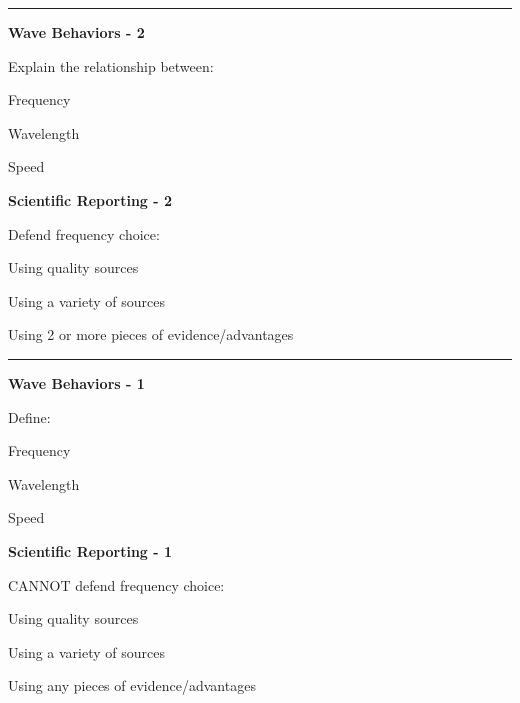 \documentclass[14pt, fleqn, paper=letter, oneside]{scrartcl}
\begin{document}
\vspace{2mm}
\rule{\textwidth}{1pt}

\noindent
\begin{minipage}[t]{0.48\textwidth}
	\hfill \textbf{Wave Behaviors - 2}\hfill\mbox{}

	Explain the relationship between:	
	\vspace{-3mm}
	\begin{checklist}[leftmargin=*]
		\item Frequency
		\item Wavelength
		\item Speed
	\end{checklist}
\end{minipage}
	\hfill\vline\hfill
\begin{minipage}[t]{0.48\textwidth}
	\hfill \textbf{Scientific Reporting - 2}\hfill\mbox{}

	
	Defend frequency choice:
	\vspace{-3mm}
	\begin{checklist}[leftmargin=*]
		\item Using quality sources
		\item Using a variety of sources
		\item Using 2 or more pieces of evidence/advantages
	\end{checklist}
\end{minipage}

\vspace{2mm}
\rule{\textwidth}{1pt}

\noindent
\begin{minipage}[t]{0.48\textwidth}
	\hfill \textbf{Wave Behaviors - 1}\hfill\mbox{}

	Define:
	\vspace{-3mm}
	\begin{checklist}[leftmargin=*]
		\item Frequency
		\item Wavelength
		\item Speed
	\end{checklist}
\end{minipage}
	\hfill\vline\hfill
\begin{minipage}[t]{0.48\textwidth}
	\hfill \textbf{Scientific Reporting - 1}\hfill\mbox{}

	CANNOT defend frequency choice:
	\vspace{-3mm}
	\begin{checklist}[leftmargin=*]
		\item Using quality sources
		\item Using a variety of sources
		\item Using any pieces of evidence/advantages
	\end{checklist}
\end{minipage}
\end{document}
